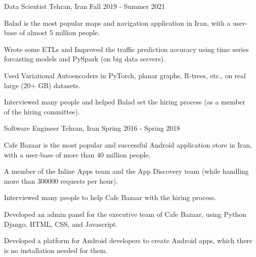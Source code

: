 

\begin{cventries}

 \cventry
    {} %
    {Data Scientist} %
    {Tehran, Iran} %
    {Fall 2019 - Summer 2021} %
    {
      \begin{cvitems} %
        \item {Balad is the most popular maps and navigation application in Iran, with a user-base of almost 5 million people.}
        \item {Wrote some ETLs and Improved the traffic prediction accuracy using time series forcasting models and PySpark (on big data servers).}
        \item {Used Variational Autoencoders in PyTorch, planar graphs, R-trees, etc., on real large (20+ GB) datasets.}
        \item {Interviewed many people and helped Balad set the hiring process (as a member of the hiring committee).}
      \end{cvitems}
    }

  \cventry
    {} %
    {Software Engineer} %
    {Tehran, Iran} %
    {Spring 2016 - Spring 2018} %
    {
      \begin{cvitems} %
        \item {Cafe Bazaar is the most popular and successful Android application store in Iran, with a user-base of more than 40 million people.}
        \item {A member of the Inline Apps team and the App Discovery team (while handling more than 300000 requests per hour).}
        \item {Interviewed many people to help Cafe Bazaar with the hiring process.}
        \item {Developed an admin panel for the executive team of Cafe Bazaar, using Python Django, HTML, CSS, and Javascript.}
        \item {Developed a platform for Android developers to create Android apps, which there is no installation needed for them.}
      \end{cvitems}
    }


\end{cventries}
